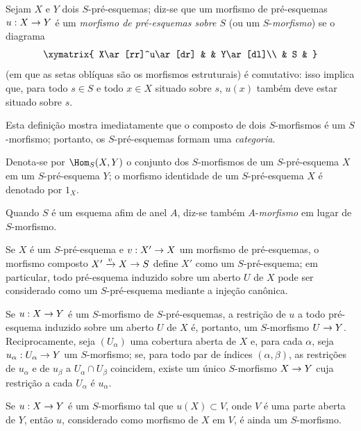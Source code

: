 \documentclass[oneside]{amsart}
\makeatletter
\newcommand{\ega@arrow}[2]{\mathchoice{#1}{#2}{#2}{#2}}
\renewcommand{\to}{\ega@arrow{\longrightarrow}{\rightarrow}}
\newcommand{\oldpage}[2][]{{\marginnote{\normalfont\textbf{#1}~|~#2}}\ignorespaces}
\let\EGAOriginalLabel\label
\renewcommand{\label}[1]{\phantomsection\EGAOriginalLabel{#1}}
\makeatother
\begin{document}
\begin{env}[2.5.2]
\label{I.2.5.2}
Sejam $X$ e $Y$ dois $S$-pré-esquemas; diz-se que um morfismo de pré-esquemas $u:X\to Y$ é um \emph{morfismo de pré-esquemas sobre $S$} (ou um $S$-\emph{morfismo}) se o diagrama
\label{I.2.5.2.diagram}
\[
  \xymatrix{
    X\ar[rr]^u\ar[dr] & & Y\ar[dl]\\
    & S &
  }
\]
(em que as setas oblíquas são os morfismos estruturais) é comutativo: isso implica que, para todo $s\in S$ e todo $x\in X$ situado sobre $s$, $u(x)$ também deve estar situado sobre $s$.
\end{env}

Esta definição mostra imediatamente que o composto de dois $S$-morfismos é um $S$-morfismo; portanto, os $S$-pré-esquemas formam uma \emph{categoria}.

Denota-se por $\Hom_S(X,Y)$ o conjunto dos $S$-morfismos de um $S$-pré-esquema $X$ em um $S$-pré-esquema $Y$; o morfismo identidade de um $S$-pré-esquema $X$ é denotado por $1_X$.

Quando $S$ é um esquema afim de anel $A$, diz-se também $A$-\emph{morfismo} em lugar de $S$-morfismo.

\begin{env}[2.5.3]
\label{I.2.5.3}
\oldpage[I]{104}
Se $X$ é um $S$-pré-esquema e $v:X'\to X$ um morfismo de pré-esquemas, o
morfismo composto $X'\xrightarrow{v}X\to S$ define $X'$ como um
$S$-pré-esquema; em particular, todo pré-esquema induzido sobre um aberto $U$ de
$X$ pode ser considerado como um $S$-pré-esquema mediante a injeção canônica.

Se $u:X\to Y$ é um $S$-morfismo de $S$-pré-esquemas, a restrição de $u$ a todo
pré-esquema induzido sobre um aberto $U$ de $X$ é, portanto, um $S$-morfismo
$U\to Y$. Reciprocamente, seja $(U_\alpha)$ uma cobertura aberta de $X$ e, para
cada $\alpha$, seja $u_\alpha:U_\alpha\to Y$ um $S$-morfismo; se, para todo par
de índices $(\alpha,\beta)$, as restrições de $u_\alpha$ e de $u_\beta$ a
$U_\alpha\cap U_\beta$ coincidem, existe um único $S$-morfismo $X\to Y$ cuja
restrição a cada $U_\alpha$ é $u_\alpha$.

Se $u:X\to Y$ é um $S$-morfismo tal que $u(X)\subset V$, onde $V$ é uma parte
aberta de $Y$, então $u$, considerado como morfismo de $X$ em $V$, é ainda um
$S$-morfismo.
\end{env}
\end{document}

